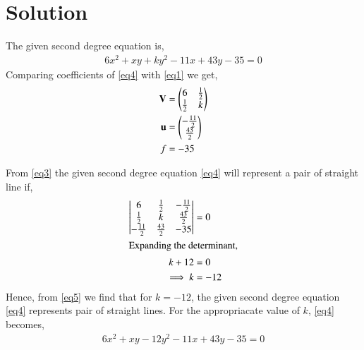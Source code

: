 \documentclass[journal,12pt,twocolumn]{IEEEtran}
\begin{document}
\section{Solution}

\begin{comment}

\begin{figure}[!h]
\centering
\resizebox{\columnwidth}{!}{}
\caption{Right Angled Triangle by Latex-Tikz}
\label{myfig}
\end{figure}
\end{comment}
The given second degree equation is,
\begin{align}
6x^2 +xy+ky^2-11x+43y-35 = 0 \label{eq4}
\end{align}
Comparing coefficients of \eqref{eq4} with \eqref{eq1} we get,
\begin{align}
\mathbf{V} &= \begin{pmatrix}6&\frac{1}{2}\\\frac{1}{2}&k\end{pmatrix}\\
\mathbf{u} &= \begin{pmatrix}-\frac{11}{2}\\\frac{43}{2}\end{pmatrix}\\
f &= -35
\end{align}

From \eqref{eq3} the given second degree equation \eqref{eq4} will represent a pair of straight line if, 
\begin{align}
\begin{vmatrix}6&\frac{1}{2}&-\frac{11}{2}\\ \frac{1}{2}&k&\frac{43}{2}\\-\frac{11}{2}& \frac{43}{2}&-35\end{vmatrix}&=0\\
\intertext{Expanding the determinant,}
k+12&=0\\
\implies k&=-12\label{eq5}
\end{align}
Hence, from \eqref{eq5} we find that for $k=-12$, the given second degree equation \eqref{eq4} represents pair of straight lines. For the appropriacate value of $k$, \eqref{eq4} becomes,
\begin{align}
6x^2 +xy-12y^2-11x+43y-35 = 0\label{eqmain}
\end{align}
\end{document}
